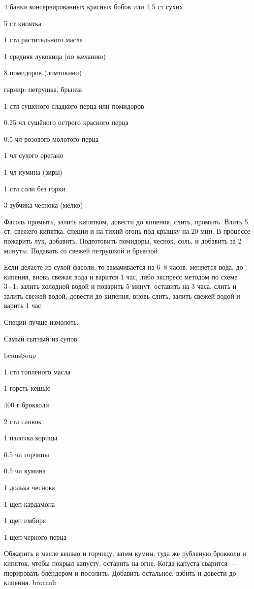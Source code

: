 {
\item 4 банки консервированных красных бобов или 1,5 ст сухих
\item 5 ст кипятка
\item 1 стл растительного масла
\item 1 средняя луковица (по желанию)
\item 8 помидоров (ломтиками)
\item гарнир: петрушка, брынза
}{
\item 1 стл сушёного сладкого перца или помидоров
\item 0.25 чл сушёного острого красного перца
\item 0.5 чл розового молотого перца
\item 1 чл сухого орегано
\item 1 чл кумина (зиры)
\item 1 стл соли без горки
\item 3 зубчика чеснока (мелко)
}{
Фасоль промыть, залить кипятком, довести до кипения, слить, промыть. Влить 5 ст. свежего кипятка, специи и на тихий огонь под крышку на 20 мин. В процессе пожарить лук, добавить. Подготовить помидоры, чеснок, соль, и добавить за 2 минуты. Подавать со свежей петрушкой и брынзой.

Если делаете из сухой фасоли, то замачивается на 6–8 часов, меняется вода, до кипения, вновь свежая вода и варится 1 час, либо экспресс методом по схеме 3+1: залить холодной водой и поварить 5 минут, оставить на 3 часа, слить и залить свежей водой, довести до кипения, вновь слить, залить свежей водой и варить 1 час.
}{
\begin{advice}
\item Специи лучше измолоть.
    \item Самый сытный из супов.
\end{advice}
}{beansSoup}



{
\item 1 стл топлёного масла
\item 1 горсть кешью
\item 400 г брокколи
\item 2 стл сливок
}{
\item 1 палочка корицы
\item 0.5 чл горчицы
\item 0.5 чл кумина
\item 1 долька чеснока
\item 1 щеп кардамона
\item 1 щеп имбиря 
\item 1 щеп черного перца
}{
Обжарить в масле кешью и горчицу, затем кумин, туда же рубленую брокколи и кипяток, чтобы покрыл капусту, оставить на огне. Когда капуста сварится~--- пюрировать блендером и посолить. Добавить остальное, взбить и довести до кипения.
}{}{broccoli}



